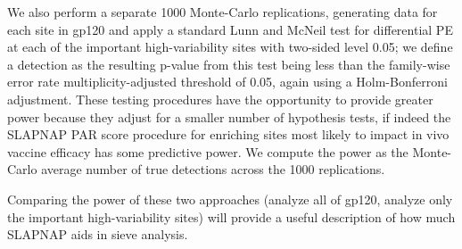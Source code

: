 \documentclass[10pt]{article}
\begin{document}
We also perform a separate 1000 Monte-Carlo replications, generating data for each site in gp120 and apply a standard Lunn and McNeil test for differential PE at each of the important high-variability sites with two-sided level 0.05; we define a detection as the resulting p-value from this test being less than the family-wise error rate multiplicity-adjusted threshold of 0.05, again using a Holm-Bonferroni adjustment. These testing procedures have the opportunity to provide greater power because they adjust for a smaller number of hypothesis tests, if indeed the SLAPNAP PAR score procedure for enriching sites most likely to impact in vivo vaccine efficacy has some predictive power. We compute the power as the Monte-Carlo average number of true detections across the 1000 replications.

Comparing the power of these two approaches (analyze all of gp120, analyze only the important high-variability sites) will provide a useful description of how much SLAPNAP aids in sieve analysis.
\end{document}
